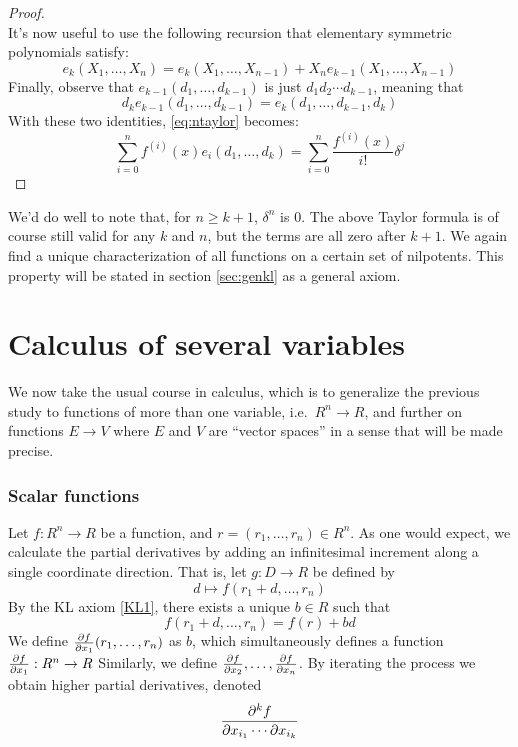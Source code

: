 \begin{proof}
\begin{equation}
    \label{eq:ntaylor}
  \end{equation}
It's now useful to use the following recursion that elementary symmetric polynomials satisfy:
\begin{equation*}
  e_k(X_1,\dots,X_n) = e_{k}(X_1,\dots,X_{n-1}) + X_{n}e_{k-1}(X_1,\dots,X_{n-1})
\end{equation*}
Finally, observe that \( e_{k-1}(d_1,\dots,d_{k-1}) \) is just \( d_1d_2\cdots d_{k-1} \), meaning that 
\begin{equation*}
  d_ke_{k-1}(d_1,\dots,d_{k-1}) = e_k(d_1,\dots, d_{k-1},d_k)
\end{equation*}
With these two identities, \ref{eq:ntaylor} becomes:
\begin{equation*}
  \sum_{i=0}^{n}f^{(i)}(x)e_i(d_1,\dots,d_k)= \sum_{i=0}^n \frac{f^{(i)}(x)}{i!}\delta^j
\end{equation*}
\end{proof}

We'd do well to note that, for \( n\geq k+1 \), \( \delta^n \) is 0. The above Taylor formula is of course still valid for any \( k \) and \( n \), but the terms are all zero after \( k+1 \). We again find a unique characterization of all functions on a certain set of nilpotents. This property will be stated in section \ref{sec:genkl} as a general axiom.

\section{Calculus of several variables}
We now take the usual course in calculus, which is to generalize the previous study to functions of more than one variable, i.e.\ \( R^n\to R \), and further on functions \( E\to V \) where \( E \) and \( V \) are ``vector spaces'' in a sense that will be made precise.

\subsubsection{Scalar functions}
Let \( f:R^n\to R \) be a function, and \( r=(r_1,\dots,r_n)\in R^n \). As one would expect, we calculate the partial derivatives by adding an infinitesimal increment along a single coordinate direction. That is, let \( g: D\to R \) be defined by
\begin{equation*}
  d\mapsto f(r_1+d,\dots,r_n)
\end{equation*}
By the KL axiom \ref{KL1}, there exists a unique \( b\in R \) such that
\begin{equation*}
  f(r_1+d,\dots,r_n) = f(r) + bd
\end{equation*}
We define \( \frac{\partial f}{\partial x_1}(r_1,\dots,r_n)\) as \( b \), which simultaneously defines a function \( \frac{\partial f}{\partial x_1}:R^n\to R \) Similarly, we define \( \frac{\partial f}{\partial x_2},\dots,\frac{\partial f}{\partial x_n} \). By iterating the process we obtain higher partial derivatives, denoted
\begin{equation*}
  \frac{\partial^{k} f}{\partial x_{i_1} \cdots \partial x_{i_k}}
\end{equation*}

